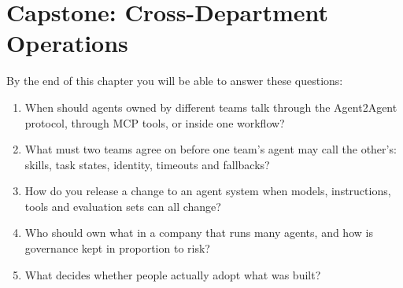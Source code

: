 
\chapter{Capstone: Cross-Department Operations}
\label{ch:capstone}

\begin{chapterquestions}
By the end of this chapter you will be able to answer these questions:
\begin{enumerate}[leftmargin=*,itemsep=2pt]
  \item When should agents owned by different teams talk through the Agent2Agent protocol, through MCP tools, or inside one workflow?
  \item What must two teams agree on before one team's agent may call the other's: skills, task states, identity, timeouts and fallbacks?
  \item How do you release a change to an agent system when models, instructions, tools and evaluation sets can all change?
  \item Who should own what in a company that runs many agents, and how is governance kept in proportion to risk?
  \item What decides whether people actually adopt what was built?
\end{enumerate}
\end{chapterquestions}

